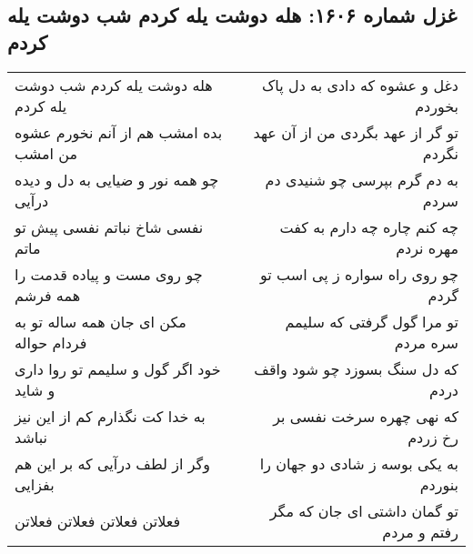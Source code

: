 \begin{center}
\section*{غزل شماره ۱۶۰۶: هله دوشت یله کردم شب دوشت یله کردم}
\label{sec:1606}
\begin{longtable}{l p{0.5cm} r}
هله دوشت یله کردم شب دوشت یله کردم
&&
دغل و عشوه که دادی به دل پاک بخوردم
\\
بده امشب هم از آنم نخورم عشوه من امشب
&&
تو گر از عهد بگردی من از آن عهد نگردم
\\
چو همه نور و ضیایی به دل و دیده درآیی
&&
به دم گرم بپرسی چو شنیدی دم سردم
\\
نفسی شاخ نباتم نفسی پیش تو ماتم
&&
چه کنم چاره چه دارم به کفت مهره نردم
\\
چو روی مست و پیاده قدمت را همه فرشم
&&
چو روی راه سواره ز پی اسب تو گردم
\\
مکن ای جان همه ساله تو به فردام حواله
&&
تو مرا گول گرفتی که سلیمم سره مردم
\\
خود اگر گول و سلیمم تو روا داری و شاید
&&
که دل سنگ بسوزد چو شود واقف دردم
\\
به خدا کت نگذارم کم از این نیز نباشد
&&
که نهی چهره سرخت نفسی بر رخ زردم
\\
وگر از لطف درآیی که بر این هم بفزایی
&&
به یکی بوسه ز شادی دو جهان را بنوردم
\\
فعلاتن فعلاتن فعلاتن فعلاتن
&&
تو گمان داشتی ای جان که مگر رفتم و مردم
\\
\end{longtable}
\end{center}
